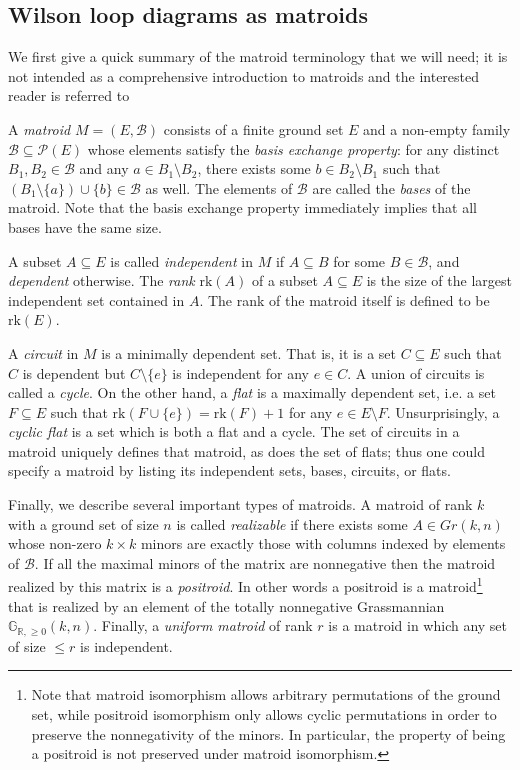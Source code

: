 \documentclass[11pt]{article}
\newcommand{\R}{\mathbb{R}}
\newcommand{\Gr}{\mathbb{G}_{\R, \geq 0}}
\newcommand{\rk}{\textrm{rk} }
\newcommand{\cP}{\mathcal{P}}
\newcommand{\cB}{\mathcal{B}}
\theoremstyle{remark}
\theoremstyle{definition}
\begin{document}
\subsection{Wilson loop diagrams as matroids\label{sec matroid background}}

We first give a quick summary of the matroid terminology that we will need; it is not intended as a comprehensive introduction to matroids and the interested reader is referred to \cite{OxleyMatroidBook} 

A {\em matroid} $M = (E,\cB)$ consists of a finite ground set $E$ and a non-empty family $\cB \subseteq \cP(E)$ whose elements satisfy the {\em basis exchange property}: for any distinct $B_1,B_2 \in \cB$ and any $a \in B_1 \setminus B_2$, there exists some $b \in B_2 \setminus B_1$ such that $(B_1 \setminus \{a\})\cup \{b\} \in \cB$ as well. The elements of $\cB$ are called the {\em bases} of the matroid. Note that the basis exchange property immediately implies that all bases have the same size.

A subset $A \subseteq E$ is called {\em independent} in $M$ if $A \subseteq B$ for some $B \in \cB$, and {\em dependent} otherwise. The {\em rank}  $\rk(A)$ of a subset $A \subseteq E$ is the size of the largest independent set contained in $A$. The rank of the matroid itself is defined to be $\rk(E)$.

A {\em circuit} in $M$ is a minimally dependent set. That is, it is a set $C \subseteq E$ such that $C$ is dependent but $C \setminus \{e\}$ is independent for any $e \in C$. A union of circuits is called a {\em cycle}. On the other hand, a {\em flat} is a maximally dependent set, i.e. a set $F \subseteq E$ such that $\rk(F \cup \{e\}) = \rk(F) + 1$ for any $e \in E \setminus F$. Unsurprisingly, a {\em cyclic flat} is a set which is both a flat and a cycle. The set of circuits in a matroid uniquely defines that matroid, as does the set of flats; thus one could specify a matroid by listing its independent sets, bases, circuits, or flats.

Finally, we describe several important types of matroids. A matroid of rank $k$ with a ground set of size $n$ is called {\em realizable} if there exists some $A \in Gr(k,n)$ whose non-zero $k\times k$ minors are exactly those with columns indexed by elements of $\cB$. If all the maximal minors of the matrix are nonnegative then the matroid realized by this matrix is a {\em positroid}.  In other words a positroid is a matroid\footnote{Note that matroid isomorphism allows arbitrary permutations of the ground set, while positroid isomorphism only allows cyclic permutations in order to preserve the nonnegativity of the minors.  In particular, the property of being a positroid is not preserved under matroid isomorphism.} that is realized by an element of the totally nonnegative Grassmannian $\Gr(k,n)$. Finally, a {\em uniform matroid} of rank $r$ is a matroid in which any set of size $\leq r$ is independent.
\end{document}
